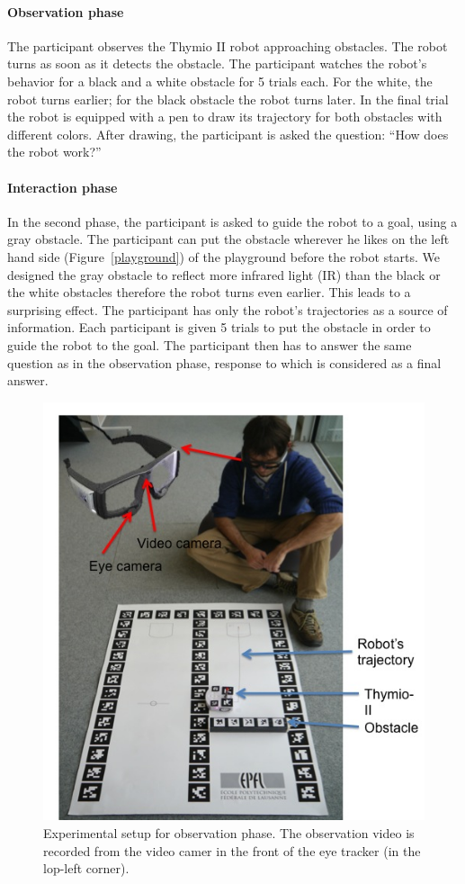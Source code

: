 \documentclass{sig-alternate}
\begin{document}
\paragraph{Observation phase} The participant observes the Thymio II robot
approaching obstacles. The robot turns as soon as it detects the
obstacle. The participant watches the robot's behavior for a black and a
white obstacle for 5 trials each. For the white, the robot turns
earlier; for the black obstacle the robot turns later. In the final
trial the robot is equipped with a pen to draw its trajectory for both
obstacles with different colors. After drawing, the participant is asked
the question: ``How does the robot work?''

\paragraph{Interaction phase} In the second phase, the participant is asked
to guide the robot to a goal, using a gray obstacle. The participant can put the
obstacle wherever he likes on the left hand side (Figure~\ref{playground}) of
the playground before the robot starts. We designed the gray obstacle to reflect
more infrared light (IR) than the black or the white obstacles therefore the
robot turns even earlier. This leads to a surprising effect. The participant has
only the robot's trajectories as a source of information. Each participant is
given 5 trials to put the obstacle in order to guide the robot to the goal. The
participant then has to answer the same question as in the observation phase,
response to which is considered as a final answer.

\begin{figure}
    \centering
    \includegraphics[width=0.9\linewidth]{expe}
    \caption{\small Experimental setup for observation phase. The observation
    video is recorded from the video camer in the front of the eye tracker (in
    the lop-left corner).}

    \label{expe}
\end{figure}
\end{document}
